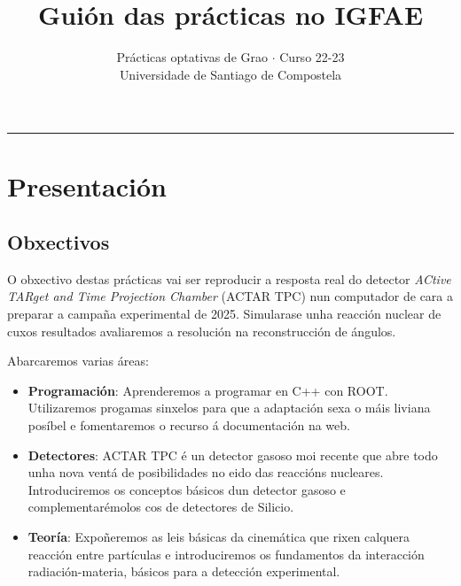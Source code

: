 \documentclass[11pt, a4paper]{article}
\title{\textbf{Guión das prácticas no IGFAE}}
\author{%
\small{Prácticas optativas de Grao $\cdot$ Curso 22-23}\\
\small{Universidade de Santiago de Compostela}}
\date{\empty}%
\begin{document}
\begin{minipage}{0.48\linewidth}
    \maketitle
\end{minipage}\hfill
\begin{minipage}{0.48\linewidth}
    \tableofcontents
\end{minipage}

\noindent\rule{\textwidth}{1pt}
\section{Presentación}
\subsection{Obxectivos}
O obxectivo destas prácticas vai ser reproducir a resposta real do detector \textit{ACtive TARget and Time Projection Chamber} (ACTAR TPC) nun computador de cara a preparar a campaña experimental de 2025. Simularase unha reacción nuclear de cuxos resultados avaliaremos a resolución na reconstrucción de ángulos.

Abarcaremos varias áreas:
\begin{itemize}
    \item \textbf{Programación}: Aprenderemos a programar en C++ con ROOT. Utilizaremos progamas sinxelos para que a adaptación sexa o máis liviana posíbel e fomentaremos o recurso á documentación na web.
    \item \textbf{Detectores}: ACTAR TPC é un detector gasoso moi recente que abre todo unha nova ventá de posibilidades no eido das reaccións nucleares. Introduciremos os conceptos básicos dun detector gasoso e complementarémolos cos de detectores de Silicio.
    \item \textbf{Teoría}: Expoñeremos as leis básicas da cinemática que rixen calquera reacción entre partículas e introduciremos os fundamentos da interacción radiación-materia, básicos para a detección experimental.
\end{itemize}
\end{document}
